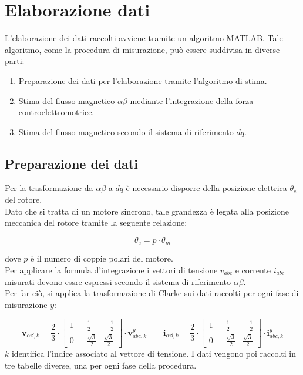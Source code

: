 \section{Elaborazione dati}
L'elaborazione dei dati raccolti avviene tramite un algoritmo MATLAB. Tale algoritmo, come la procedura di misurazione, può essere suddivisa in diverse parti:
\begin{enumerate}
 \item Preparazione dei dati per l'elaborazione tramite l'algoritmo di stima.
 \item Stima del flusso magnetico $\alpha\beta$ mediante l'integrazione della forza controelettromotrice.
 \item Stima del flusso magnetico secondo il sistema di riferimento $dq$.
\end{enumerate}

\subsection{Preparazione dei dati}
Per la trasformazione da $\alpha\beta$ a $dq$ è necessario disporre della posizione elettrica $\theta_e$ del rotore.\\
Dato che si tratta di un motore sincrono, tale grandezza è legata alla posizione meccanica del rotore tramite la seguente relazione:

\begin{equation}
\theta_e = {p}\cdot\theta_m
\end{equation}

dove $p$ è il numero di coppie polari del motore.\\
Per applicare la formula d'integrazione i vettori di tensione $v_{abc}$ e corrente $i_{abc}$ misurati devono essre espressi secondo il sistema di riferimento $\alpha\beta$.\\ 
Per far ciò, si applica la trasformazione di Clarke sui dati raccolti per ogni fase di misurazione $y$:

\begin{equation}
    \boldsymbol{v}_{\alpha\beta,k} = \frac{2}{3} \cdot 
    \begin{bmatrix} 
        1 & -\frac{1}{2} & -\frac{1}{2} \\ 
        0 & -\frac{\sqrt{3}}{2} & \frac{\sqrt{3}}{2} 
    \end{bmatrix} 
    \cdot \boldsymbol{v}_{abc,k}^y
    \qquad
    \boldsymbol{i}_{\alpha\beta,k} = \frac{2}{3} \cdot 
    \begin{bmatrix} 
        1 & -\frac{1}{2} & -\frac{1}{2} \\ 
        0 & -\frac{\sqrt{3}}{2} & \frac{\sqrt{3}}{2} 
    \end{bmatrix} 
    \cdot \boldsymbol{i}_{abc,k}^y
\end{equation}
$k$ identifica l'indice associato al vettore di tensione.
I dati vengono poi raccolti in tre tabelle diverse, una per ogni fase della procedura.\\
